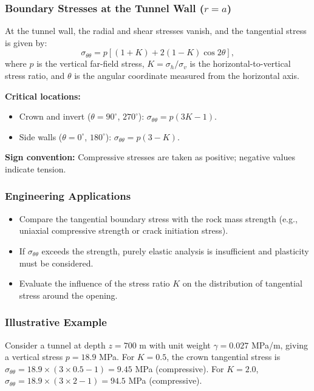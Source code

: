 \documentclass[a4paper,12pt]{article}
\begin{document}
\subsubsection{Boundary Stresses at the Tunnel Wall ($r = a$)}
At the tunnel wall, the radial and shear stresses vanish, and the tangential stress is given by:
\[
\sigma_{\theta\theta} = p\left[(1 + K) + 2(1 - K)\cos 2\theta\right],
\]
where $p$ is the vertical far-field stress, $K = \sigma_h / \sigma_v$ is the horizontal-to-vertical stress ratio, and $\theta$ is the angular coordinate measured from the horizontal axis.

\textbf{Critical locations:}
\begin{itemize}
    \item Crown and invert ($\theta = 90^\circ$, $270^\circ$): $\sigma_{\theta\theta} = p(3K - 1)$.
    \item Side walls ($\theta = 0^\circ$, $180^\circ$): $\sigma_{\theta\theta} = p(3 - K)$.
\end{itemize}

\textbf{Sign convention:} Compressive stresses are taken as positive; negative values indicate tension.

\subsubsection{Engineering Applications}
\begin{itemize}
    \item Compare the tangential boundary stress with the rock mass strength (e.g., uniaxial compressive strength or crack initiation stress).
    \item If $\sigma_{\theta\theta}$ exceeds the strength, purely elastic analysis is insufficient and plasticity must be considered.
    \item Evaluate the influence of the stress ratio $K$ on the distribution of tangential stress around the opening.
\end{itemize}

\subsubsection{Illustrative Example}
Consider a tunnel at depth $z = 700$ m with unit weight $\gamma = 0.027$ MPa/m, giving a vertical stress $p = 18.9$ MPa. For $K = 0.5$, the crown tangential stress is $\sigma_{\theta\theta} = 18.9 \times (3 \times 0.5 - 1) = 9.45$ MPa (compressive). For $K = 2.0$, $\sigma_{\theta\theta} = 18.9 \times (3 \times 2 - 1) = 94.5$ MPa (compressive).
\end{document}
